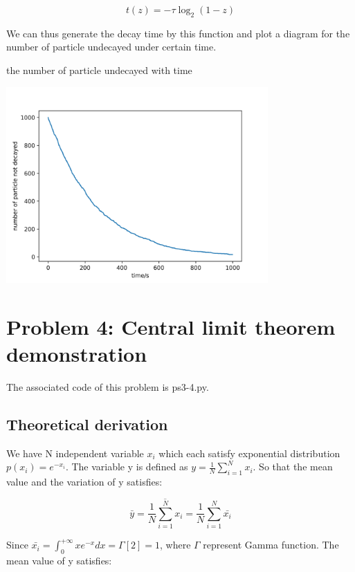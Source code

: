 \documentclass[letterpaper,12pt]{article}
\begin{document}
\begin{equation}
    t(z) = -\tau \log_2(1-z)
\end{equation}

We can thus generate the decay time by this function and plot a diagram for the number of particle undecayed under certain time.

\begin{table}[!h]
    \centering
    \caption{the number of particle undecayed with time}
    \includegraphics[width=10cm]{ps3-3.png}
    \label{plot}%
\end{table}%

\newpage




\section{Problem 4: Central limit theorem demonstration}

The associated code of this problem is ps3-4.py.

\subsection{Theoretical derivation}

We have N independent variable $x_i$ which each satisfy exponential distribution $p(x_i) = e^{-x_i}$. The variable y is defined as $y = \frac{1}{N}\sum_{i=1}^{N}x_i$. So that the mean value and the variation of y satisfies:

\begin{equation}
    \bar{y} = \overline{\frac{1}{N}\sum_{i=1}^{N}x_i} = \frac{1}{N}\sum_{i=1}^{N}\bar{x_i}
\end{equation}

Since $\bar{x_i} = \int_0^{+\infty} xe^{-x}dx = \Gamma[2] = 1$, where $\Gamma$ represent Gamma function. The mean value of y satisfies:
\end{document}
